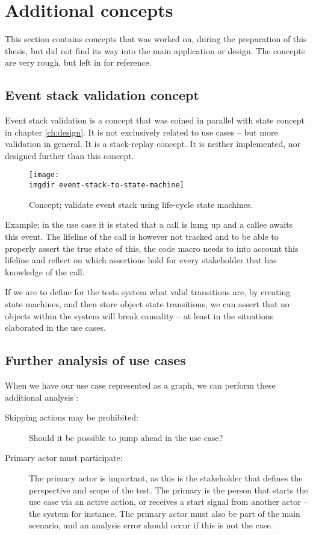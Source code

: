 \chapter{Additional concepts}
This section contains concepts that was worked on, during the preparation of this thesis, but did not find its way into the main application or design. The concepts are very rough, but left in for reference.
\section{Event stack validation concept}
\label{appendix:event-stack-validation}
Event stack validation is a concept that was coined in parallel with state concept in chapter \ref{ch:design}. It is not exclusively related to use cases -- but more validation in general. It is a stack-replay concept. It is neither implemented, nor designed further than this concept.\medskip

\begin{figure}[ht]
\centering
\texttt{[image: \\imgdir event-stack-to-state-machine]}
\caption{Concept; validate event stack using life-cycle state machines.}
\label{fig:event-stack-to-state-machine}
\end{figure}

\noindent
Example; in the use case it is stated that a call is hung up and a callee awaits this event. The lifeline of the call is however not tracked and to be able to properly assert the true state of this, the code macro needs to into account this lifeline and reflect on which assertions hold for every stakeholder that has knowledge of the call.\medskip

\noindent
If we are to define for the tests system what valid transitions are, by creating state machines, and then store object state transitions, we can assert that no objects within the system will break causality -- at least in the situations elaborated in the use cases.\medskip

\section{Further analysis of use cases}
When we have our use case represented as a graph, we can perform these additional analysis':

\begin{description}
  
  \item[Skipping actions may be prohibited:] Should it be possible to jump ahead in the use case?

  \item[Primary actor must participate:] The primary actor is important, as this is the stakeholder that defines the perspective and scope of the test. The primary is the person that starts the use case via an active action, or receives a start signal from another actor -- the system for instance. The primary actor must also be part of the main scenario, and an analysis error should occur if this is not the case.
\end{description}

